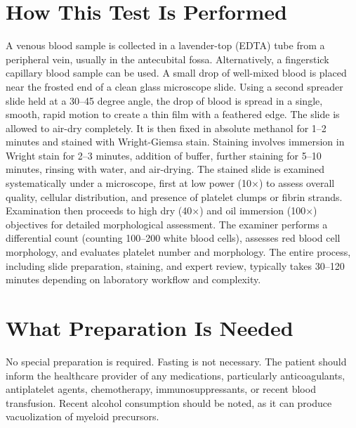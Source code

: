 \section*{How This Test Is Performed}
A venous blood sample is collected in a lavender-top (EDTA) tube from a peripheral vein, usually in the antecubital fossa. Alternatively, a fingerstick capillary blood sample can be used. A small drop of well-mixed blood is placed near the frosted end of a clean glass microscope slide. Using a second spreader slide held at a 30--45 degree angle, the drop of blood is spread in a single, smooth, rapid motion to create a thin film with a feathered edge. The slide is allowed to air-dry completely. It is then fixed in absolute methanol for 1--2 minutes and stained with Wright-Giemsa stain. Staining involves immersion in Wright stain for 2--3 minutes, addition of buffer, further staining for 5--10 minutes, rinsing with water, and air-drying. The stained slide is examined systematically under a microscope, first at low power (10$\times$) to assess overall quality, cellular distribution, and presence of platelet clumps or fibrin strands. Examination then proceeds to high dry (40$\times$) and oil immersion (100$\times$) objectives for detailed morphological assessment. The examiner performs a differential count (counting 100--200 white blood cells), assesses red blood cell morphology, and evaluates platelet number and morphology. The entire process, including slide preparation, staining, and expert review, typically takes 30--120 minutes depending on laboratory workflow and complexity.

\section*{What Preparation Is Needed}
No special preparation is required. Fasting is not necessary. The patient should inform the healthcare provider of any medications, particularly anticoagulants, antiplatelet agents, chemotherapy, immunosuppressants, or recent blood transfusion. Recent alcohol consumption should be noted, as it can produce vacuolization of myeloid precursors.


